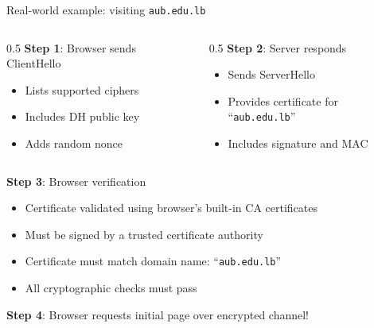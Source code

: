 \ifdefined\PRESENTATION\else\PassOptionsToClass{handout}{beamer}\fi\documentclass[aspectratio=169, lualatex]{beamer}
\begin{document}
\begin{frame}{Real-world example: visiting \texttt{aub.edu.lb}}
	\begin{columns}[c]
		\begin{column}{0.5\textwidth}
			\textbf{Step 1}: Browser sends ClientHello
			\begin{itemize}
				\item Lists supported ciphers
				\item Includes DH public key
				\item Adds random nonce
			\end{itemize}
		\end{column}
		\pause
		\begin{column}{0.5\textwidth}
			\textbf{Step 2}: Server responds
			\begin{itemize}
				\item Sends ServerHello
				\item Provides certificate for ``\texttt{aub.edu.lb}''
				\item Includes signature and MAC
			\end{itemize}
		\end{column}
	\end{columns}
	\pause
	\begin{center}
		\textbf{Step 3}: Browser verification
	\end{center}
	\begin{itemize}
		\item Certificate validated using browser's built-in CA certificates
		\item Must be signed by a trusted certificate authority
		\item Certificate must match domain name: ``\texttt{aub.edu.lb}''
		\item All cryptographic checks must pass
	\end{itemize}
	\pause
	\begin{center}
		\textbf{Step 4}: Browser requests initial page over encrypted channel!
	\end{center}
\end{frame}
\end{document}
